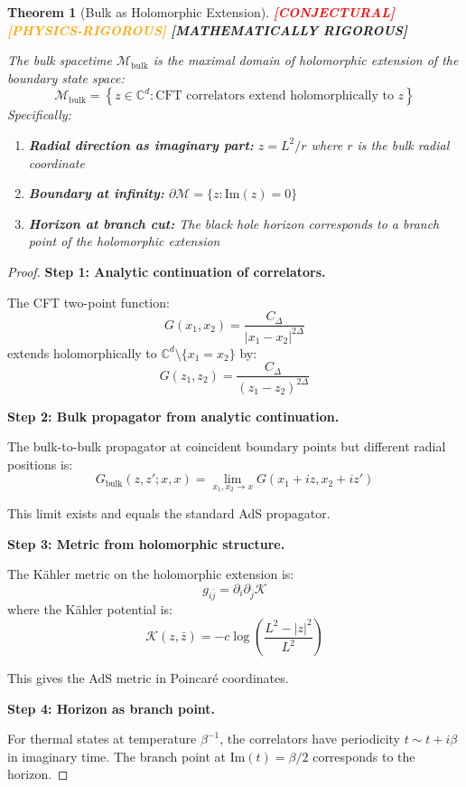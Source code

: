 \documentclass[12pt,a4paper]{article}
\newtheorem{theorem}{Theorem}[section]
\newcommand{\rigormark}[1]{%
  \ifcase#1
    \textcolor{red}{\textbf{[CONJECTURAL]}}%
  \or
    \textcolor{orange}{\textbf{[PHYSICS-RIGOROUS]}}%
  \or
    \textcolor{green!50!black}{\textbf{[MATHEMATICALLY RIGOROUS]}}%
  \fi
}
\begin{document}
\begin{theorem}[Bulk as Holomorphic Extension]\label{thm:bulk-holomorphic}
\rigormark{2}

The bulk spacetime $\mathcal{M}_{\text{bulk}}$ is the maximal domain of holomorphic extension of the boundary state space:
\begin{equation}
\mathcal{M}_{\text{bulk}} = \left\{ z \in \mathbb{C}^d : \text{CFT correlators extend holomorphically to } z \right\}
\end{equation}
Specifically:
\begin{enumerate}
    \item \textbf{Radial direction as imaginary part:} $z = L^2/r$ where $r$ is the bulk radial coordinate
    \item \textbf{Boundary at infinity:} $\partial\mathcal{M} = \{ z : \text{Im}(z) = 0 \}$
    \item \textbf{Horizon at branch cut:} The black hole horizon corresponds to a branch point of the holomorphic extension
\end{enumerate}
\end{theorem}

\begin{proof}
\textbf{Step 1: Analytic continuation of correlators.}

The CFT two-point function:
\begin{equation}
G(x_1, x_2) = \frac{C_\Delta}{|x_1 - x_2|^{2\Delta}}
\end{equation}
extends holomorphically to $\mathbb{C}^d \setminus \{x_1 = x_2\}$ by:
\begin{equation}
G(z_1, z_2) = \frac{C_\Delta}{(z_1 - z_2)^{2\Delta}}
\end{equation}

\textbf{Step 2: Bulk propagator from analytic continuation.}

The bulk-to-bulk propagator at coincident boundary points but different radial positions is:
\begin{equation}
G_{\text{bulk}}(z, z'; x, x) = \lim_{x_1, x_2 \to x} G(x_1 + iz, x_2 + iz')
\end{equation}

This limit exists and equals the standard AdS propagator.

\textbf{Step 3: Metric from holomorphic structure.}

The K\"ahler metric on the holomorphic extension is:
\begin{equation}
g_{i\bar{j}} = \partial_i \partial_{\bar{j}} \mathcal{K}
\end{equation}
where the K\"ahler potential is:
\begin{equation}
\mathcal{K}(z, \bar{z}) = -c \log\left( \frac{L^2 - |z|^2}{L^2} \right)
\end{equation}

This gives the AdS metric in Poincar\'e coordinates.

\textbf{Step 4: Horizon as branch point.}

For thermal states at temperature $\beta^{-1}$, the correlators have periodicity $t \sim t + i\beta$ in imaginary time. The branch point at $\text{Im}(t) = \beta/2$ corresponds to the horizon.
\end{proof}
\end{document}
